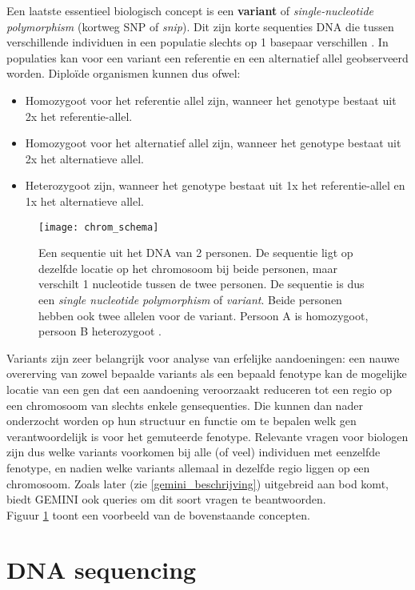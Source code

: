 Een laatste essentieel biologisch concept is een \textbf{variant} of \textit{single-nucleotide polymorphism} (kortweg SNP of \textit{snip}). Dit zijn korte sequenties DNA die tussen verschillende individuen in een populatie slechts op 1 basepaar verschillen \cite{alberts2007molecular}. In populaties kan voor een variant een referentie en een alternatief allel geobserveerd worden. Diplo\"ide organismen kunnen dus ofwel:
\begin{itemize}
\item Homozygoot voor het referentie allel zijn, wanneer het genotype bestaat uit 2x het referentie-allel.
\item Homozygoot voor het alternatief allel zijn, wanneer het genotype bestaat uit 2x het alternatieve allel.
\item Heterozygoot zijn, wanneer het genotype bestaat uit 1x het referentie-allel en 1x het alternatieve allel.
\end{itemize}
\begin{figure}[!hb]
\texttt{[image: chrom\_schema]}
\caption{Een sequentie uit het DNA van 2 personen. De sequentie ligt op dezelfde locatie op het chromosoom bij beide personen, maar verschilt 1 nucleotide tussen de twee personen. De sequentie is dus een \textit{single nucleotide polymorphism} of \textit{variant}. Beide personen hebben ook twee allelen voor de variant. Persoon A is homozygoot, persoon B heterozygoot \cite{chrom_clipart}.}
\label{chrom_schema}
\end{figure}
Variants zijn zeer belangrijk voor analyse van erfelijke aandoeningen: een nauwe overerving van zowel bepaalde variants als een bepaald fenotype kan de mogelijke locatie van een gen dat een aandoening veroorzaakt reduceren tot een regio op een chromosoom van slechts enkele gensequenties. Die kunnen dan nader onderzocht worden op hun structuur en functie om te bepalen welk gen verantwoordelijk is voor het gemuteerde fenotype. Relevante vragen voor biologen zijn dus welke variants voorkomen bij alle (of veel) individuen met eenzelfde fenotype, en nadien welke variants allemaal in dezelfde regio liggen op een chromosoom. Zoals later (zie \ref{gemini_beschrijving}) uitgebreid aan bod komt, biedt GEMINI ook queries om dit soort vragen te beantwoorden.\\
Figuur \ref{chrom_schema} toont een voorbeeld van de bovenstaande concepten.\\

\section{DNA sequencing}

